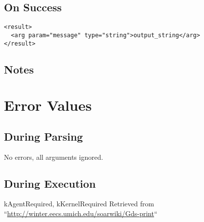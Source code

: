 \documentclass[10pt]{article}
\begin{document}
\subsection*{ On Success }
\begin{verbatim}
<result>
  <arg param="message" type="string">output_string</arg>
</result>

\end{verbatim}
\subsection*{ Notes }
\section*{ Error Values }
\subsection*{ During Parsing }


 No errors, all arguments ignored. 
\subsection*{ During Execution }


 kAgentRequired, kKernelRequired Retrieved from ``\url{http://winter.eecs.umich.edu/soarwiki/Gds-print}``
\end{document}
